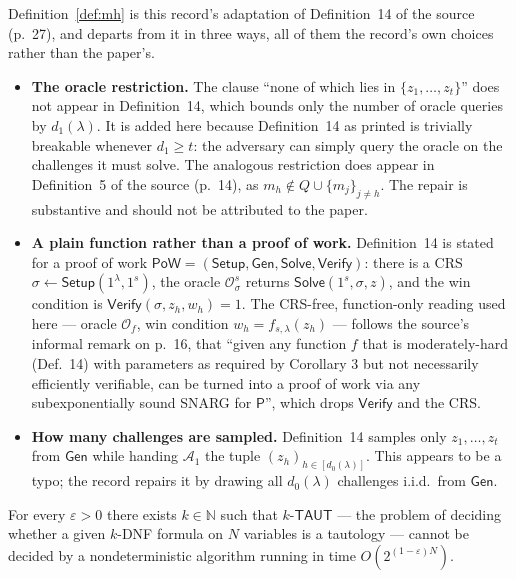 \documentclass{aicr-conjecture}
\newcommand{\NN}{\mathbb{N}}
\newcommand{\Gen}{\mathsf{Gen}}
\newcommand{\Solve}{\mathsf{Solve}}
\newcommand{\Verify}{\mathsf{Verify}}
\newcommand{\Setup}{\mathsf{Setup}}
\newcommand{\Adv}{\mathcal{A}}
\newcommand{\Orc}{\mathcal{O}}
\newcommand{\TAUT}{\mathsf{TAUT}}
\begin{document}
\begin{remark}\label{rem:prov}
Definition~\ref{def:mh} is this record's adaptation of Definition~14 of the source (p.~27), and departs from it in three ways, all of them the record's own choices rather than the paper's.
\begin{itemize}
\item \textbf{The oracle restriction.} The clause ``none of which lies in $\{z_1,\dots,z_t\}$'' does not appear in Definition~14, which bounds only the number of oracle queries by $d_1(\lambda)$. It is added here because Definition~14 as printed is trivially breakable whenever $d_1 \ge t$: the adversary can simply query the oracle on the challenges it must solve. The analogous restriction does appear in Definition~5 of the source (p.~14), as $m_h \notin Q \cup \{m_j\}_{j \ne h}$. The repair is substantive and should not be attributed to the paper.
\item \textbf{A plain function rather than a proof of work.} Definition~14 is stated for a proof of work $\mathsf{PoW} = (\Setup, \Gen, \Solve, \Verify)$: there is a CRS $\sigma \leftarrow \Setup(1^{\lambda},1^{s})$, the oracle $\Orc^{s}_{\sigma}$ returns $\Solve(1^{s},\sigma,z)$, and the win condition is $\Verify(\sigma,z_h,w_h) = 1$. The CRS-free, function-only reading used here --- oracle $\Orc_f$, win condition $w_h = f_{s,\lambda}(z_h)$ --- follows the source's informal remark on p.~16, that ``given any function $f$ that is moderately-hard (Def.\ 14) with parameters as required by Corollary 3 but not necessarily efficiently verifiable, can be turned into a proof of work via any subexponentially sound SNARG for $\mathsf{P}$'', which drops $\Verify$ and the CRS.
\item \textbf{How many challenges are sampled.} Definition~14 samples only $z_1,\dots,z_t$ from $\Gen$ while handing $\Adv_1$ the tuple $(z_h)_{h \in [d_0(\lambda)]}$. This appears to be a typo; the record repairs it by drawing all $d_0(\lambda)$ challenges i.i.d.\ from $\Gen$.
\end{itemize}
\end{remark}

\begin{definition}[NSETH]\label{def:nseth}
For every $\varepsilon > 0$ there exists $k \in \NN$ such that $k$-$\TAUT$ --- the problem of deciding whether a given $k$-DNF formula on $N$ variables is a tautology --- cannot be decided by a nondeterministic algorithm running in time $O(2^{(1-\varepsilon)N})$.
\end{definition}
\end{document}
